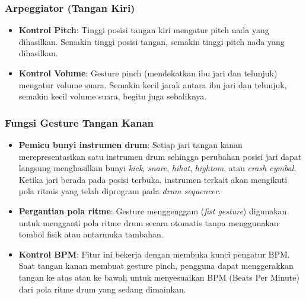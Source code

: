 \subsubsection{Arpeggiator (Tangan Kiri)}
\begin{itemize}
    \item \textbf{Kontrol Pitch}: Tinggi posisi tangan kiri mengatur pitch nada yang dihasilkan. Semakin tinggi posisi tangan, semakin tinggi pitch nada yang dihasilkan.
    \item \textbf{Kontrol Volume}: Gesture pinch (mendekatkan ibu jari dan telunjuk) mengatur volume suara. Semakin kecil jarak antara ibu jari dan telunjuk, semakin kecil volume suara, begitu juga sebaliknya.
\end{itemize}

\subsubsection{Fungsi Gesture Tangan Kanan}
\begin{itemize}
    \item \textbf{Pemicu bunyi instrumen drum}: Setiap jari tangan kanan merepresentasikan satu instrumen drum sehingga perubahan posisi jari dapat langsung menghasilkan bunyi \textit{kick}, \textit{snare}, \textit{hihat}, \textit{hightom}, atau \textit{crash cymbal}. Ketika jari berada pada posisi terbuka, instrumen terkait akan mengikuti pola ritmis yang telah diprogram pada \textit{drum sequencer}.
    \item \textbf{Pergantian pola ritme}: Gesture menggenggam (\textit{fist gesture}) digunakan untuk mengganti pola ritme drum secara otomatis tanpa menggunakan tombol fisik atau antarmuka tambahan.
    \item \textbf{Kontrol BPM}: Fitur ini bekerja dengan membuka kunci pengatur BPM. Saat tangan kanan membuat gesture pinch, pengguna dapat menggerakkan tangan ke atas atau ke bawah untuk menyesuaikan BPM (Beats Per Minute) dari pola ritme drum yang sedang dimainkan.
\end{itemize}